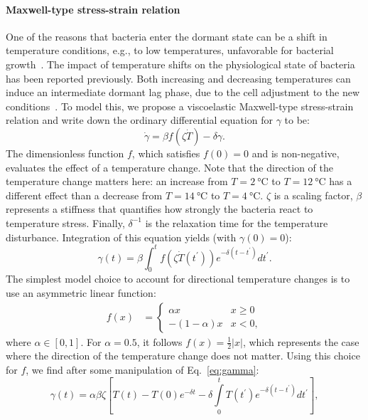 \documentclass[10pt,1p,authoryear]{elsarticle}
\numberwithin{equation}{section}
\begin{document}
\paragraph{Maxwell-type stress-strain relation}
One of the reasons that bacteria enter the dormant state can be a shift in temperature conditions, e.g., to low temperatures, unfavorable for bacterial growth~\citep{oliver_viable_1995}. The impact of temperature shifts on the physiological state of bacteria has been reported previously. Both increasing and decreasing temperatures can induce an intermediate dormant lag phase, due to the cell adjustment to the new conditions~\citep{swinnen_predictive_2004}. To model this, we propose a viscoelastic Maxwell-type stress-strain relation and write down the ordinary differential equation for $\gamma$ to be:
\begin{equation}
    \dot{\gamma} = \beta f\left(\zeta\dot{T}\right)-\delta \gamma.
\end{equation}
The dimensionless function $f$, which satisfies $f(0)=0$ and is non-negative, evaluates the effect of a temperature change.
Note that the direction of the temperature change matters here: an increase from $T=2~\unit{\degreeCelsius}$ to $T=12~\unit{\degreeCelsius}$ has a different effect than a decrease from $T=14~\unit{\degreeCelsius}$ to $T=4~\unit{\degreeCelsius}$.
$\zeta$ is a scaling factor, $\beta$ represents a stiffness that quantifies how strongly the bacteria react to temperature stress.
Finally, $\delta^{-1}$ is the relaxation time for the temperature disturbance.
Integration of this equation yields (with $\gamma(0)=0$):
\begin{equation}
	\label{eq:gamma}
    \gamma(t) = \beta\int_0^t f\left(\zeta\dot{T}(t^{\prime})\right)e^{-\delta (t-t^{\prime})}dt^{\prime}.
\end{equation}
The simplest model choice to account for directional temperature changes is to use an asymmetric linear function:
\begin{align}
f(x)&=\begin{cases}\alpha x& x\ge 0\\ -(1-\alpha) x& x < 0,\end{cases}
\label{eq:f_stress}
\end{align}
where $\alpha\in [0,1]$. For $\alpha=0.5$, it follows $f(x)=\frac{1}{2}|x|$, which represents the case where the direction of the temperature change does not matter.
Using this choice for $f$, we find after some manipulation of Eq.~\eqref{eq:gamma}:
\begin{equation}
    \gamma(t) = \alpha\beta\zeta\left [T(t)-T(0)e^{-\delta t}-\delta
        \int\limits_0^t T(t^{\prime})e^{-\delta (t-t^{\prime})}dt^{\prime}\right ],
\end{equation}
\end{document}
